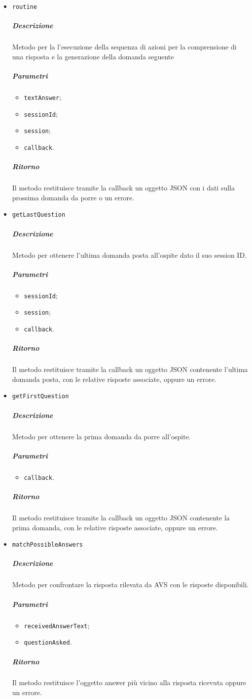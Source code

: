 \documentclass[../ManualeSviluppatore_v2.0.0.tex]{subfiles}
\begin{document}
\begin{itemize}
	\item \texttt{routine}
	      \subparagraph{Descrizione} Metodo per la l'esecuzione della sequenza di azioni per la comprensione di una risposta e la generazione della domanda seguente
	      \subparagraph{Parametri}
	      \begin{itemize}
	      	\item \texttt{textAnswer};
	      	\item \texttt{sessionId};
	      	\item \texttt{session};
	      	\item \texttt{callback}.
	      \end{itemize}
	      \subparagraph{Ritorno} Il metodo restituisce tramite la callback un oggetto JSON con i dati sulla prossima domanda da porre o un errore.

	\item \texttt{getLastQuestion}
	      \subparagraph{Descrizione} Metodo per ottenere l'ultima domanda posta all'ospite dato il suo session ID.
	      \subparagraph{Parametri}
	      \begin{itemize}
	      	\item \texttt{sessionId};
	      	\item \texttt{session};
	      	\item \texttt{callback}.
	      \end{itemize}
	      \subparagraph{Ritorno} Il metodo restituisce tramite la callback un oggetto JSON contenente l'ultima domanda posta, con le relative risposte associate, oppure un errore.

	\item \texttt{getFirstQuestion}
	      \subparagraph{Descrizione} Metodo per ottenere la prima domanda da porre all'ospite.
	      \subparagraph{Parametri}
	      \begin{itemize}
	      	\item \texttt{callback}.
	      \end{itemize}
	      \subparagraph{Ritorno} Il metodo restituisce tramite la callback un oggetto JSON contenente la prima domanda, con le relative risposte associate, oppure un errore.

	\item \texttt{matchPossibleAnswers}
	      \subparagraph{Descrizione} Metodo per confrontare la risposta rilevata da AVS con le risposte disponibili.
	      \subparagraph{Parametri}
	      \begin{itemize}
	      	\item \texttt{receivedAnswerText};
	      	\item \texttt{questionAsked}.
	      \end{itemize}
	      \subparagraph{Ritorno} Il metodo restituisce l'oggetto answer più vicino alla risposta ricevuta oppure un errore.


\end{itemize}
\end{document}
